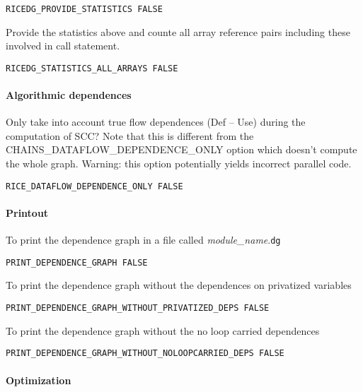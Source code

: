 \begin{verbatim}
RICEDG_PROVIDE_STATISTICS FALSE
\end{verbatim}

Provide the statistics above and counte all array reference pairs
including these involved in call statement.

\begin{verbatim}
RICEDG_STATISTICS_ALL_ARRAYS FALSE
\end{verbatim}

\paragraph{Algorithmic dependences}

Only take into account true flow dependences (Def -- Use) during the computation of
SCC?  Note that this is different from the
CHAINS_DATAFLOW_DEPENDENCE_ONLY option which doesn't compute the whole
graph.  Warning: this option potentially yields incorrect parallel code.

\begin{verbatim}
RICE_DATAFLOW_DEPENDENCE_ONLY FALSE
\end{verbatim}

\paragraph{Printout}

To print the dependence graph in a file called {\em module\_name}.{\tt dg}

\begin{verbatim}
PRINT_DEPENDENCE_GRAPH FALSE
\end{verbatim}

To print the dependence graph without the dependences on privatized
variables 

\begin{verbatim}
PRINT_DEPENDENCE_GRAPH_WITHOUT_PRIVATIZED_DEPS FALSE
\end{verbatim}

To print the dependence graph without the no loop carried dependences
 
\begin{verbatim}
PRINT_DEPENDENCE_GRAPH_WITHOUT_NOLOOPCARRIED_DEPS FALSE
\end{verbatim}

\paragraph{Optimization}

